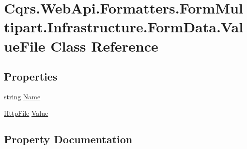 \hypertarget{classCqrs_1_1WebApi_1_1Formatters_1_1FormMultipart_1_1Infrastructure_1_1FormData_1_1ValueFile}{}\section{Cqrs.\+Web\+Api.\+Formatters.\+Form\+Multipart.\+Infrastructure.\+Form\+Data.\+Value\+File Class Reference}
\label{classCqrs_1_1WebApi_1_1Formatters_1_1FormMultipart_1_1Infrastructure_1_1FormData_1_1ValueFile}
\subsection*{Properties}
\begin{DoxyCompactItemize}
\item 
string \hyperlink{classCqrs_1_1WebApi_1_1Formatters_1_1FormMultipart_1_1Infrastructure_1_1FormData_1_1ValueFile_a2410547f01c8ae8c6d5dd70d3f92284c}{Name}
\item 
\hyperlink{classCqrs_1_1WebApi_1_1Formatters_1_1FormMultipart_1_1Infrastructure_1_1HttpFile}{Http\+File} \hyperlink{classCqrs_1_1WebApi_1_1Formatters_1_1FormMultipart_1_1Infrastructure_1_1FormData_1_1ValueFile_aebbbefbeda7233acb846f54aaa2f26c2}{Value}
\end{DoxyCompactItemize}


\subsection{Property Documentation}
\mbox{\label{classCqrs_1_1WebApi_1_1Formatters_1_1FormMultipart_1_1Infrastructure_1_1FormData_1_1ValueFile_a2410547f01c8ae8c6d5dd70d3f92284c}} 
